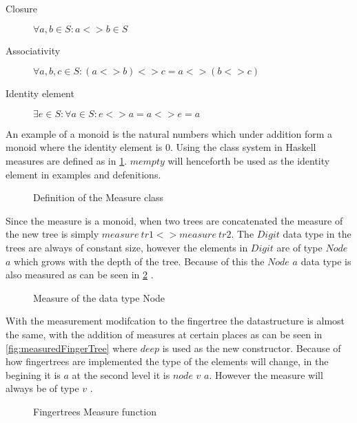\begin{description}
\item[Closure] $\forall a,b \in S: a <> b \in S$
\item[Associativity] $\forall a,b,c \in S: (a <> b) <> c = a <> (b <> c)$
\item[Identity element] $\exists e \in S: \forall a \in S: e <> a = a <> e = a$
\end{description}

An example of a monoid is the natural numbers which under addition form a monoid
where the identity element is $0$.
Using the class system in Haskell measures are defined as in \cref{fig:measure}.
$mempty$ will henceforth be used as the identity element in examples and
defenitions.

\begin{figure}[h!]

\caption{Definition of the Measure class \label{fig:measure} \cite{fingertree}}
\end{figure}

Since the measure is a monoid, when two trees are concatenated the measure of 
the new tree is simply $measure ~ tr1 <> measure ~ tr2$.
The $Digit$ data type in the trees are always of constant size, however the
elements in $Digit$ are of type $Node$ $a$ which grows with the depth of the tree.
Because of this the $Node$ $a$ data type is also measured as can be seen in
\cref{fig:measureNode} \cite{fingertree}.

\begin{figure}[h!]

\caption{Measure of the data type Node \label{fig:measureNode} \cite{fingertree}}
\end{figure}

With the measurement modifcation to the fingertree the datastructure is almost
the same, with the addition of measures at certain places as can be seen in
\cref{fig:measuredFingerTree} where $deep$ is used as the new constructor.
Because of how fingertrees are implemented the type of the elements will change,
in the begining it is $a$ at the second level it is $node$ $v$ $a$. However the
measure will always be of type $v$ \cite{fingertree}.

\begin{figure}[h!]

\caption{Fingertrees Measure function \label{fig:measureFingerTree} \cite{fingertree}}
\end{figure}


